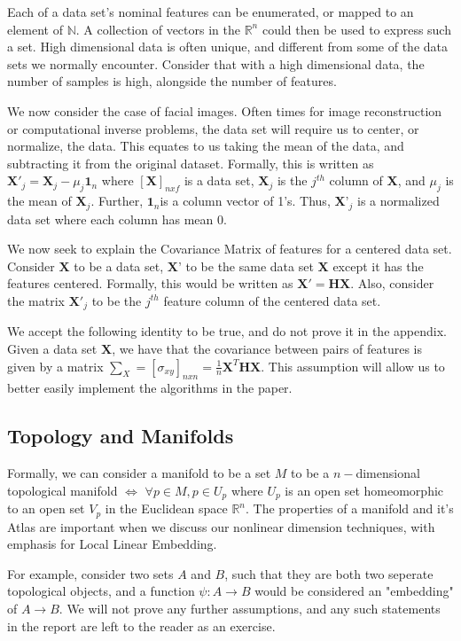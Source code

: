 \documentclass[12pt]{article}
\begin{document}
Each of a data set's nominal features can be enumerated, or mapped to an element of $\mathbb{N}$. A collection of vectors in the $\mathbb{R}^n$ could then be used to express such a set. High dimensional data is often unique, and different from some of the data sets we normally encounter. Consider that with a high dimensional data, the number of samples is high, alongside the number of features.

We now consider the case of facial images. Often times for image reconstruction or computational inverse problems, the data set will require us to center, or normalize, the data. This equates to us taking the mean of the data, and subtracting it from the original dataset. Formally, this is written as $\textbf{X}'_j=\textbf{X}_j-\mu_j\textbf{1}_n$ where $[\textbf{X}]_{n x f}$ is a data set, $\textbf{X}_j$ is the $j^{th}$ column of $\textbf{X}$, and $\mu_j$ is the mean of $\textbf{X}_j$. Further, $\textbf{1}_n$is a column vector of 1's. Thus, $\textbf{X'}_j$ is a normalized data set where each column has mean 0.


We now seek to explain the Covariance Matrix of features for a centered data set. Consider $\textbf{X}$ to be a data set, $\textbf{X'}$ to be the same data set $\textbf{X}$ except it has the features centered. Formally, this would be written as $\textbf{X}'=\textbf{HX}$. Also, consider the matrix $\textbf{X}'_j$ to be the $j^{th}$ feature column of the centered data set.

We accept the following identity to be true, and do not prove it in the appendix. Given a data set $\textbf{X}$, we have that the covariance between pairs of features is given by a matrix $\sum_X=[\sigma_{xy}]_{nxn}=\frac{1}{n}\textbf{X}^T\textbf{HX}$. This assumption will allow us to better easily implement the algorithms in the paper. 

\subsection{Topology and Manifolds}

Formally, we can consider a manifold to be a set $M$ to be a $n-$dimensional topological manifold $\iff$ $\forall p\in M,p\in U_p$ where $U_p$ is an open set homeomorphic to an open set $V_p$ in the Euclidean space $\mathbb{R}^n.$ The properties of a manifold and it's Atlas are important when we discuss our nonlinear dimension techniques, with emphasis for Local Linear Embedding.

For example, consider two sets $A$ and $B$, such that they are both two seperate topological objects, and a function $\psi:A\to B$ would be considered an "embedding" of $A\to B$. We will not prove any further assumptions, and any such statements in the report are left to the reader as an exercise. 
\end{document}
